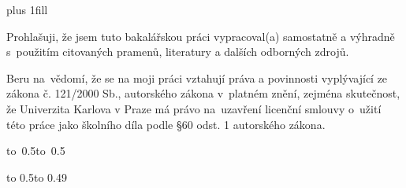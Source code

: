 
\openright
\hypersetup{pageanchor=true}
\pagestyle{plain}
\vglue 0pt plus 1fill

\noindent
Prohlašuji, že jsem tuto bakalářskou práci vypracoval(a) samostatně a výhradně
s~použitím citovaných pramenů, literatury a dalších odborných zdrojů.

\medskip\noindent
Beru na~vědomí, že se na moji práci vztahují práva a povinnosti vyplývající
ze zákona č. 121/2000 Sb., autorského zákona v~platném znění, zejména skutečnost,
že Univerzita Karlova v Praze má právo na~uzavření licenční smlouvy o~užití této
práce jako školního díla podle §60 odst. 1 autorského zákona.

\vspace{10mm}

\hbox{\hbox to 0.5\hbox to 0.5}

\vspace{20mm}
\newpage


\openright

\vbox to 0.5\nobreak\vbox to 0.49

\newpage


\openright

\noindent
\Podekovani

\newpage

\openright
\pagestyle{plain}
\setcounter{page}{1}
